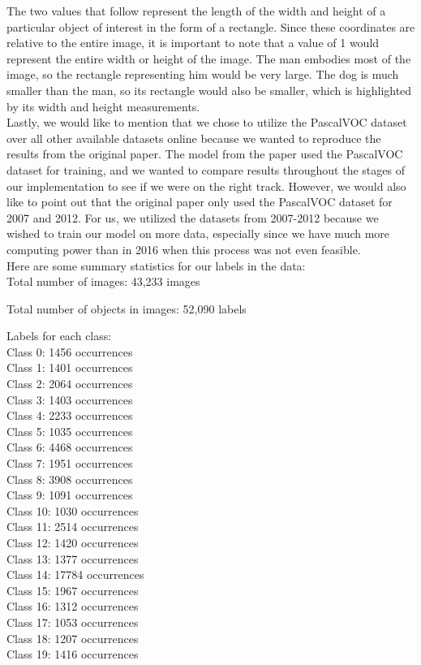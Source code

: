 \documentclass{article}
\begin{document}
The two values that follow represent the length of the width and height of a particular object of interest in the form of a rectangle. Since these coordinates are relative to the entire image, it is important to note that a value of 1 would represent the entire width or height of the image. The man embodies most of the image, so the rectangle representing him would be very large. The dog is much smaller than the man, so its rectangle would also be smaller, which is highlighted by its width and height measurements. \\

Lastly, we would like to mention that we chose to utilize the PascalVOC dataset over all other available datasets online because we wanted to reproduce the results from the original paper. The model from the paper used the PascalVOC dataset for training, and we wanted to compare results throughout the stages of our implementation to see if we were on the right track. However, we would also like to point out that the original paper only used the PascalVOC dataset for 2007 and 2012. For us, we utilized the datasets from 2007-2012 because we wished to train our model on more data, especially since we have much more computing power than in 2016 when this process was not even feasible. \\

Here are some summary statistics for our labels in the data: \\

Total number of images: 43,233 images

Total number of objects in images: 52,090 labels

Labels for each class: \\
Class 0: 1456 occurrences \\
Class 1: 1401 occurrences \\
Class 2: 2064 occurrences \\
Class 3: 1403 occurrences \\
Class 4: 2233 occurrences \\
Class 5: 1035 occurrences \\
Class 6: 4468 occurrences \\
Class 7: 1951 occurrences \\
Class 8: 3908 occurrences \\
Class 9: 1091 occurrences \\
Class 10: 1030 occurrences \\
Class 11: 2514 occurrences \\
Class 12: 1420 occurrences \\
Class 13: 1377 occurrences \\
Class 14: 17784 occurrences \\
Class 15: 1967 occurrences \\
Class 16: 1312 occurrences \\
Class 17: 1053 occurrences \\
Class 18: 1207 occurrences \\
Class 19: 1416 occurrences \\
\end{document}
